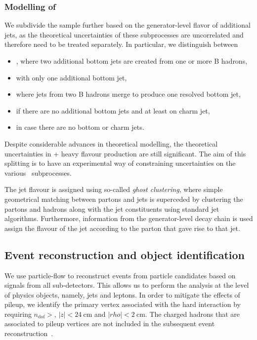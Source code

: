 \subsubsection{Modelling of \ttbar}
\label{sec:ttbar_subprocesses}
We subdivide the \ttbar sample further based on the generator-level flavor of additional jets, as the theoretical uncertainties of these subprocesses are uncorrelated and therefore need to be treated separately. In particular, we distinguish between
\begin{itemize}
\item \ttbb, where two additional bottom jets are created from one or more B hadrons,
\item \ttb with only one additional bottom jet,
\item \tttwob where jets from two B hadrons merge to produce one resolved bottom jet,
\item \ttcc if there are no additional bottom jets and at least on charm jet,
\item \ttlf in case there are no bottom or charm jets.
\end{itemize}
Despite considerable advances in theoretical modelling, the theoretical uncertainties in \ttbar + heavy flavour production are still significant\cite{Cascioli:2013era}. The aim of this splitting is to have an experimental way of constraining uncertainties on the various \ttbar~subprocesses.

The jet flavour is assigned using so-called \textit{ghost clustering}, where simple geometrical matching between partons and jets is superceded by clustering the partons and hadrons along with the jet constituents using standard jet algorithms. Furthermore, information from the generator-level decay chain is used assign the flavour of the jet according to the parton that gave rise to that jet\cite{Bartosik:2047049}.

\subsection{Event reconstruction and object identification}
\label{sec:object_id}
We use particle-flow to reconstruct events from particle candidates based on signals from all sub-detectors. This allows us to perform the analysis at the level of physics objects, namely, jets and leptons\cite{cms_particleflow:2017}. In order to mitigate the effects of pileup, we identify the primary vertex associated with the hard interaction by requiring $n_{\mathrm{dof}} > $, $|z| < 24~\mathrm{cm}$ and $|rho|<2~\mathrm{cm}$. The charged hadrons that are associated to pileup vertices are not included in the subsequent event reconstruction~\cite{CMS:2014ata}.

